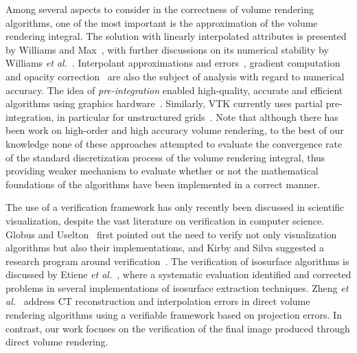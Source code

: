 Among several aspects to consider in the correctness of volume
rendering algorithms, one of the most important is the approximation
of the volume rendering integral. The solution with linearly
interpolated attributes is presented by Williams and
Max~\cite{Williams1992}, with further discussions on its numerical
stability by Williams \emph{et al.}~\cite{Williams1998}.  Interpolant
approximations and
errors~\cite{Hajjar08,Moller:1996:CLE:236226.236235,Moller1997,Novins:1992:CPV:147130.147154},
gradient computation~\cite{Alim2010} and opacity
correction~\cite{Lee2007} are also the subject of analysis with regard
to numerical accuracy. The idea of \emph{pre-integration} enabled
high-quality, accurate and efficient algorithms using graphics
hardware~\cite{Engel01,Kye:2008p871,Rottger2000}. Similarly, VTK
currently uses partial pre-integration, in particular for unstructured
grids~\cite{Moreland2004}. Note that although there has been work on
high-order and high accuracy volume rendering, to the best of our
knowledge none of these approaches attempted to evaluate the convergence
rate of the standard discretization process of the volume rendering integral, thus providing
weaker mechanism to evaluate whether or not the mathematical foundations of the algorithms
have been implemented in a correct manner.

The use of a verification framework has only recently been discussed
in scientific visualization, despite the vast literature on
verification in computer science. Globus and Uselton~\cite{globus95}
first pointed out the need to verify not only visualization algorithms
but also their implementations, and Kirby and Silva suggested a
research program around verification~\cite{kirby-vv-08}. The
verification of isosurface algorithms is discussed by Etiene \emph{et
al.}~\cite{Etiene:2012:TVI:2197070.2197097, etiene:tvcg:2009}, where a systematic evaluation identified and
corrected problems in several implementations of isosurface extraction
techniques.  Zheng \emph{et al.}~\cite{Zheng10} address CT reconstruction and
interpolation errors in direct volume rendering algorithms using a
verifiable framework based on projection errors. In contrast, our work
focuses on the verification of the final image produced through direct
volume rendering.


